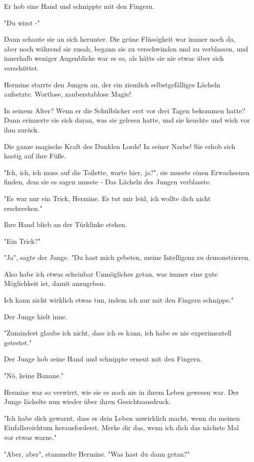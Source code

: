 {Er hob eine Hand und schnippte mit den Fingern.

"Du wirst -"

Dann schaute sie an sich herunter. Die grüne Flüssigkeit war immer noch da, aber noch während sie zusah, begann sie zu verschwinden und zu verblassen, und innerhalb weniger Augenblicke war es so, als hätte sie nie etwas über sich verschüttet.

Hermine starrte den Jungen an, der ein ziemlich selbstgefälliges Lächeln aufsetzte. Wortlose, zauberstablose Magie!

In seinem Alter? Wenn er die Schulbücher erst vor drei Tagen bekommen hatte? Dann erinnerte sie sich daran, was sie gelesen hatte, und sie keuchte und wich vor ihm zurück.

Die ganze magische Kraft des Dunklen Lords! In seiner Narbe! Sie erhob sich hastig auf ihre Füße.

"Ich, ich, ich muss auf die Toilette, warte hier, ja?", sie musste einen Erwachsenen finden, dem sie es sagen musste - Das Lächeln des Jungen verblasste.

"Es war nur ein Trick, Hermine. Es tut mir leid, ich wollte dich nicht erschrecken."

Ihre Hand blieb an der Türklinke stehen.

"Ein Trick?"

"Ja", sagte der Junge. "Du hast mich gebeten, meine Intelligenz zu demonstrieren.

Also habe ich etwas scheinbar Unmögliches getan, was immer eine gute Möglichkeit ist, damit anzugeben.

Ich kann nicht wirklich etwas tun, indem ich nur mit den Fingern schnippe."

Der Junge hielt inne.

"Zumindest glaube ich nicht, dass ich es kann, ich habe es nie experimentell getestet."

Der Junge hob seine Hand und schnippte erneut mit den Fingern.

"Nö, keine Banane."

Hermine war so verwirrt, wie sie es noch nie in ihrem Leben gewesen war. Der Junge lächelte nun wieder über ihren Gesichtsausdruck.

"Ich habe dich gewarnt, dass es dein Leben unwirklich macht, wenn du meinen Einfallsreichtum herausforderst. Merke dir das, wenn ich dich das nächste Mal vor etwas warne."

"Aber, aber", stammelte Hermine. "Was hast du dann getan?"

}

